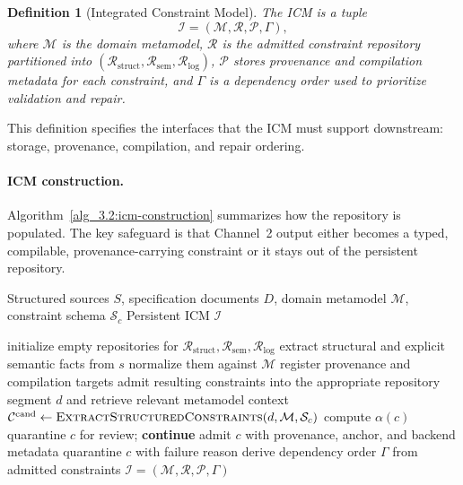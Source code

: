 \documentclass[acmlarge,nonacm]{acmart}
\theoremstyle{acmplain}
\theoremstyle{acmdefinition}
\newtheorem{definition}{Definition}[section]
\begin{document}
\begin{definition}[Integrated Constraint Model]
\label{def:icm}
The ICM is a tuple
\[
\mathcal{I}=(\mathcal{M},\mathcal{R},\mathcal{P},\Gamma),
\]
where $\mathcal{M}$ is the domain metamodel, $\mathcal{R}$ is the admitted constraint repository partitioned into $(\mathcal{R}_{\mathrm{struct}},\mathcal{R}_{\mathrm{sem}},\mathcal{R}_{\mathrm{log}})$, $\mathcal{P}$ stores provenance and compilation metadata for each constraint, and $\Gamma$ is a dependency order used to prioritize validation and repair.
\end{definition}

This definition specifies the interfaces that the ICM must support downstream: storage, provenance, compilation, and repair ordering.

\paragraph{ICM construction.}
Algorithm~\ref{alg_3.2:icm-construction} summarizes how the repository is populated. The key safeguard is that Channel~2 output either becomes a typed, compilable, provenance-carrying constraint or it stays out of the persistent repository.

\begin{algorithm}[t]
\caption{ICM Construction via Dual-Channel Extraction}
\label{alg_3.2:icm-construction}
\begin{algorithmic}[1]
\small
\Require Structured sources $S$, specification documents $D$, domain metamodel $\mathcal{M}$, constraint schema $\mathcal{S}_c$
\Ensure Persistent ICM $\mathcal{I}$

  \State initialize empty repositories for $\mathcal{R}_{\mathrm{struct}}, \mathcal{R}_{\mathrm{sem}}, \mathcal{R}_{\mathrm{log}}$
   
    \State extract structural and explicit semantic facts from $s$
    \State normalize them against $\mathcal{M}$
    \State register provenance and compilation targets
    \State admit resulting constraints into the appropriate repository
  \EndFor
   
    \State segment $d$ and retrieve relevant metamodel context
    \State $\mathcal{C}^{\mathrm{cand}} \gets \textsc{ExtractStructuredConstraints}(d,\mathcal{M},\mathcal{S}_c)$
      \State compute $\alpha(c)$
        \State quarantine $c$ for review; \textbf{continue}
      \EndIf
        \State admit $c$ with provenance, anchor, and backend metadata
      \Else
        \State quarantine $c$ with failure reason
      \EndIf
    \EndFor
  \EndFor
  \State derive dependency order $\Gamma$ from admitted constraints
  \State \Return $\mathcal{I}=(\mathcal{M},\mathcal{R},\mathcal{P},\Gamma)$
\EndFunction
\end{algorithmic}
\end{algorithm}
\end{document}
